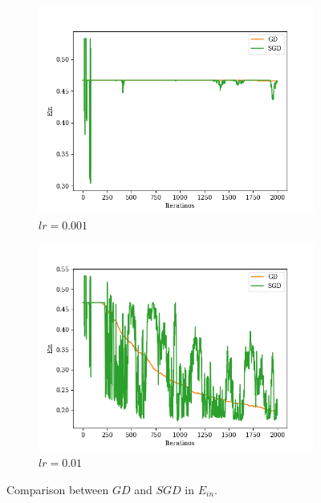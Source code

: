 \documentclass[12pt,a4paper]{article}
\begin{document}
\section{} %
\begin{figure}[h]%
	\begin{subfigure}[h]{0.45\textwidth}
		\includegraphics[width=\textwidth]{code/q8_001.png}
		\caption{$lr=0.001$}
	\end{subfigure}
	\hfill\vrule\hfill
	\begin{subfigure}[h]{0.45\textwidth}
		\includegraphics[width=\textwidth]{code/q8_01.png}
		\caption{$lr=0.01$}
	\end{subfigure}%
	\caption{Comparison between $GD$ and $SGD$ in $E_{in}$.}
	\label{fig:q8}
\end{figure}
\end{document}
